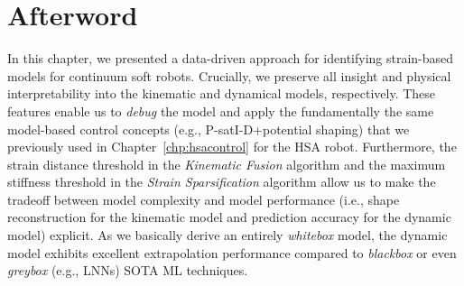 \section*{Afterword}
In this chapter, we presented a data-driven approach for identifying strain-based models for continuum soft robots. Crucially, we preserve all insight and physical interpretability into the kinematic and dynamical models, respectively. These features enable us to \emph{debug} the model and apply the fundamentally the same model-based control concepts (e.g., P-satI-D+potential shaping) that we previously used in Chapter~\ref{chp:hsacontrol} for the \gls{HSA} robot. Furthermore, the strain distance threshold in the \emph{Kinematic Fusion} algorithm and the maximum stiffness threshold in the \emph{Strain Sparsification} algorithm allow us to make the tradeoff between model complexity and model performance (i.e., shape reconstruction for the kinematic model and prediction accuracy for the dynamic model) explicit.
As we basically derive an entirely \emph{whitebox} model, the dynamic model exhibits excellent extrapolation performance compared to \emph{blackbox} or even \emph{greybox} (e.g., \glspl{LNN}) \gls{SOTA} \gls{ML} techniques.

